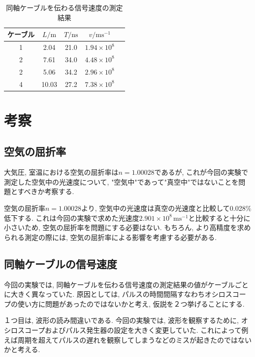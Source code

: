 \documentclass{jarticle}
\begin{document}
\begin{table}[h]
  \centering
  \caption{同軸ケーブルを伝わる信号速度の測定結果}
  \begin{tabular}{ccccc}
    \hline
    ケーブル & $L/\mathrm{m}$ & $T/\mathrm{ns}$ & $v/\mathrm{ms^{-1}}$ \\
    \hline
    1 & 2.04 & 21.0 & $1.94\times10^8$ \\
    2 & 7.61 & 34.0 & $4.48\times10^8$ \\
    2 & 5.06 & 34.2 & $2.96\times10^8$ \\
    4 & 10.03 & 27.2 & $7.38\times10^8$ \\
    \hline
  \end{tabular}
\end{table}



\section{考察}


\subsection{空気の屈折率}

大気圧, 室温における空気の屈折率は$n=1.00028$であるが, これが今回の実験で測定した空気中の光速度について, "空気中"であって"真空中"ではないことを問題とすべきか考察する.

空気の屈折率$n=1.00028$より, 空気中の光速度は真空の光速度と比較して0.028\%低下する.
これは今回の実験で求めた光速度$2.901\times10^8\,\mathrm{ms^{-1}}$と比較すると十分に小さいため, 空気の屈折率を問題にする必要はない. もちろん, より高精度を求められる測定の際には, 空気の屈折率による影響を考慮する必要がある.


\subsection{同軸ケーブルの信号速度}

今回の実験では, 同軸ケーブルを伝わる信号速度の測定結果の値がケーブルごとに大きく異なっていた.
原因としては, パルスの時間間隔すなわちオシロスコープの使い方に問題があったのではないかと考え, 仮説を２つ挙げることにする.

１つ目は, 波形の読み間違いである.
今回の実験では, 波形を観察するために, オシロスコープおよびパルス発生器の設定を大きく変更していた.
これによって例えば周期を超えてパルスの遅れを観察してしまうなどのミスが起きたのではないかと考える.
\end{document}
